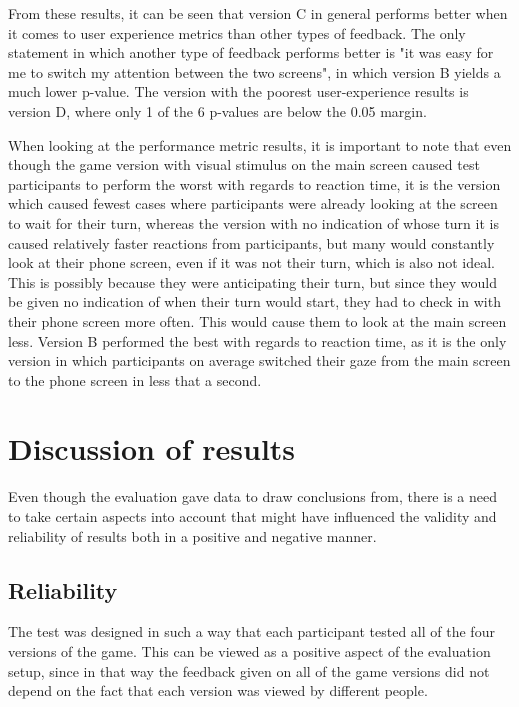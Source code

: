 From these results, it can be seen that version C in general performs better when it comes to user experience metrics than other types of feedback. The only statement in which another type of feedback performs better is "it was easy for me to switch my attention between the two screens", in which version B yields a much lower p-value. The version with the poorest user-experience results is version D, where only 1 of the 6 p-values are below the 0.05 margin.

When looking at the performance metric results, it is important to note that even though the game version with visual stimulus on the main screen caused test participants to perform the worst with regards to reaction time, it is the version which caused fewest cases where participants were already looking at the screen to wait for their turn, whereas the version with no indication of whose turn it is caused relatively faster reactions from participants, but many would constantly look at their phone screen, even if it was not their turn, which is also not ideal. This is possibly because they were anticipating their turn, but since they would be given no indication of when their turn would start, they had to check in with their phone screen more often. This would cause them to look at the main screen less. Version B performed the best with regards to reaction time, as it is the only version in which participants on average switched their gaze from the main screen to the phone screen in less that a second.

\section{Discussion of results}
Even though the evaluation gave data to draw conclusions from, there is a need to take certain aspects into account that might have influenced the validity and reliability of results both in a positive and negative manner. 

\subsection{Reliability}
The test was designed in such a way that each participant tested all of the four versions of the game. This can be viewed as a positive aspect of the evaluation setup, since in that way the feedback given on all of the game versions did not depend on the fact that each version was viewed by different people.


